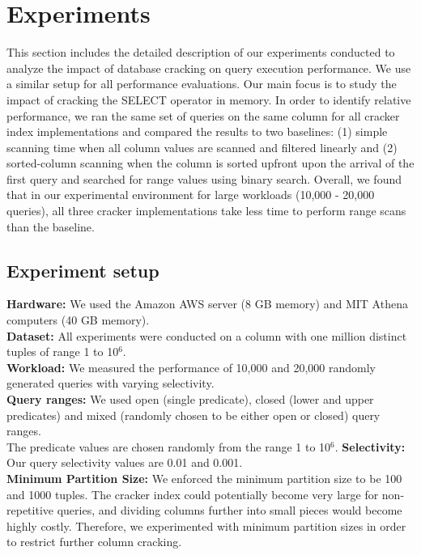 \section{Experiments}
\label{sec:experiments}
This section includes the detailed description of our experiments conducted to analyze the impact of database cracking on query execution performance. We use a similar setup for all performance evaluations. Our main focus is to study the impact of cracking the SELECT operator in memory. In order to identify relative performance, we ran the same set of queries on the same column for all cracker index implementations and compared the results to two baselines: (1) simple scanning time when all column values are scanned and filtered linearly and (2) sorted-column scanning when the column is sorted upfront upon the arrival of the first query and searched for range values using binary search. Overall, we found that in our experimental environment for large workloads (10,000 - 20,000 queries), all three cracker implementations take less time to perform range scans than the baseline.

\subsection{Experiment setup}

\textbf{Hardware:} We used the Amazon AWS server (8 GB memory) and MIT Athena computers (40 GB memory). \\
\textbf{Dataset:} All experiments were conducted on a column with one million distinct tuples of range 1 to 10${^6}$. \\
\textbf{Workload:} We measured the performance of 10,000 and 20,000 randomly generated queries with varying selectivity.\\
\textbf{Query ranges:} We used open (single predicate), closed (lower and upper predicates) and mixed (randomly chosen to be either open or closed) query ranges.\\
The predicate values are chosen randomly from the range 1 to 10${^6}$.
\textbf{Selectivity:} Our query selectivity values are 0.01 and 0.001. \\
\textbf{Minimum Partition Size: } We enforced the minimum partition size to be 100 and 1000 tuples. The cracker index could potentially become very large for non-repetitive queries, and dividing columns further into small pieces would become highly costly. Therefore, we experimented with minimum partition sizes in order to restrict further column cracking.

